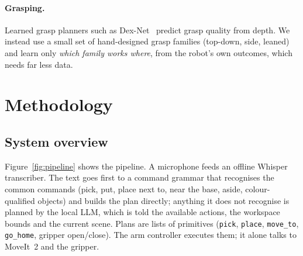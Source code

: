 \documentclass[12pt]{article}
\begin{document}
\paragraph{Grasping.}
Learned grasp planners such as Dex-Net~\cite{mahler2017dexnet} predict grasp quality from depth. We instead use a small set of hand-designed grasp families (top-down, side, leaned) and learn only \emph{which family works where}, from the robot's own outcomes, which needs far less data.

\section{Methodology}
\label{sec:method}

\subsection{System overview}

Figure~\ref{fig:pipeline} shows the pipeline. A microphone feeds an offline Whisper transcriber. The text goes first to a command grammar that recognises the common commands (pick, put, place next to, near the base, aside, colour-qualified objects) and builds the plan directly; anything it does not recognise is planned by the local LLM, which is told the available actions, the workspace bounds and the current scene. Plans are lists of primitives (\texttt{pick}, \texttt{place}, \texttt{move\_to}, \texttt{go\_home}, gripper open/close). The arm controller executes them; it alone talks to MoveIt~2 and the gripper.
\end{document}
